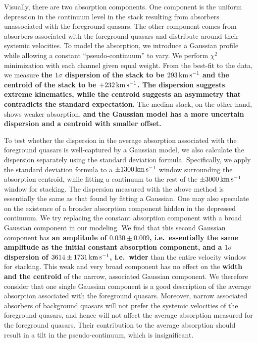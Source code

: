 \documentclass[iop]{emulateapj}
\begin{document}
Visually, there are two absorption components. One component is the uniform depression in the
continuum level in the stack resulting from absorbers unassociated with the foreground
quasars. The other component comes from absorbers associated with the foreground quasars and
distribute around their systemic velocities. To model the absorption, we introduce
a Gaussian profile while allowing a constant ``pseudo-continuum'' to vary.
We perform $\chi^2$ minimization with each channel given equal weight. From the best-fit
to the data, we measure
{\bf the $1\sigma$ dispersion of the stack to be $293\,{\rm km\,s^{-1}}$ and the centroid of the
 stack to be $+232\,{\rm km\,s^{-1}}$. The dispersion suggests extreme kinematics, while
the centroid suggests an asymmetry that contradicts the standard expectation.}
The median
stack, on the other hand, shows weaker absorption,
{\bf and the Gaussian model has a more uncertain dispersion and a centroid with smaller offset.}

To test whether the dispersion in the average absorption associated with the foreground quasars is
well-captured by a Gaussian model, we also calculate the dispersion separately using the standard
deviation formula. Specifically, we apply the standard deviation formula to a $\pm1300\,{\rm km\,s^{-1}}$
window surrounding the absorption centroid, while fitting a continuum to the rest of the
$\pm3000\,{\rm km\,s^{-1}}$ window for stacking. The
dispersion measured with the above method is essentially the same as that found by fitting a Gaussian.
One may also speculate on the existence of a broader absorption component hidden in the depressed
continuum. We try replacing the constant absorption component with a broad Gaussian component in our
modeling. We find that this second Gaussian component has
{\bf an amplitude of $0.030\pm0.009$, i.e.\ essentially the same amplitude as the initial
constant absorption component, and a $1\sigma$ dispersion of $3614\pm1731\,{\rm km\,s^{-1}}$, i.e.\ wider}
than the entire velocity window for stacking.
This weak and very broad component has no effect on the {\bf width and the centroid} of the narrow,
associated Gaussian component. We therefore consider that one single Gaussian component is a good
description of the average absorption associated with the foreground quasars.
Moreover, narrow associated absorbers of background quasars will not prefer the systemic velocities of
the foreground quasars, and hence will not affect the average absorption measured for the foreground
quasars. Their contribution to the average absorption should result in a tilt in the
pseudo-continuum, which is insignificant.
\end{document}
